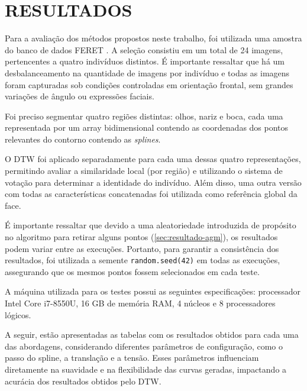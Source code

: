 \chapter{RESULTADOS} \label{cha:resultados}

Para a avaliação dos métodos propostos neste trabalho, foi utilizada uma amostra do banco de dados FERET \cite{FERET1,FERET2}. A seleção consistiu em um total de 24 imagens, pertencentes a quatro indivíduos distintos. É importante ressaltar que há um desbalanceamento na quantidade de imagens por indivíduo e todas as imagens foram capturadas sob condições controladas em orientação frontal, sem grandes variações de ângulo ou expressões faciais. %

Foi preciso segmentar quatro regiões distintas: olhos, nariz e boca, cada uma representada por um array bidimensional contendo as coordenadas dos pontos relevantes do contorno contendo as \textit{splines}.

O DTW foi aplicado separadamente para cada uma dessas quatro representações, permitindo avaliar a similaridade local (por região) e utilizando o sistema de votação para determinar a identidade do indivíduo. Além disso, uma outra versão com todas as características concatenadas foi utilizada como referência global da face.

É importante ressaltar que devido a uma aleatoriedade introduzida de propósito no algoritmo para retirar alguns pontos (\autoref{sec:resultado-agm}), os resultados podem variar entre as execuções. Portanto, para garantir a consistência dos resultados, foi utilizada a semente \texttt{random.seed(42)} em todas as execuções, assegurando que os mesmos pontos fossem selecionados em cada teste.

A máquina utilizada para os testes possui as seguintes especificações: processador Intel Core i7-8550U, 16 GB de memória RAM, 4 núcleos e 8 processadores lógicos.

A seguir, estão apresentadas as tabelas com os resultados obtidos para cada uma das abordagens, considerando diferentes parâmetros de configuração, como o passo do spline, a translação e a tensão. Esses parâmetros influenciam diretamente na suavidade e na flexibilidade das curvas geradas, impactando a acurácia dos resultados obtidos pelo DTW.

